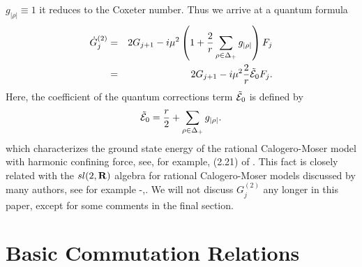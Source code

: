 \documentclass[a4paper,12pt]{article}
\begin{document}
\(g_{|\rho|}\equiv1\)  it reduces to the Coxeter number. Thus we
arrive at a quantum formula
\begin{eqnarray}
    \dot{G}_{j}^{(2)} & = & 2G_{j+1}-i\mu^{2}
    \left(1+{2\over{r}} \sum_{\rho\in\Delta_{+}}g_{|\rho|}\right)F_{j}
    \nonumber  \\
     & = &  2G_{j+1}-i\mu^{2}{2\over{r}}\tilde{\cal E}_{0}F_{j}.
    \label{Hjquant}
\end{eqnarray}
Here,  the coefficient of the quantum corrections term
\(\tilde{\cal E}_{0}\) is defined by
\begin{equation}
    \tilde{\cal E}_{0}={r\over2}+\sum_{\rho\in\Delta_{+}}g_{|\rho|}.
    \label{defE0}
\end{equation}
which characterizes the ground state energy of the rational
Calogero-Moser model with harmonic confining force, see, for example,
(2.21) of \cite{kps}. This fact is closely related with
the $sl(2,{\bf R})$
algebra for rational Calogero-Moser models discussed by many authors,
see for example \cite{Pere1}-\cite{Br},\cite{Heck,Gonera1}.
We will not discuss $G_j^{(2)}$ any longer in this paper,
except for some comments in the final section.

\section{Basic Commutation Relations}
\label{basecomm}
\setcounter{equation}{0}
\end{document}

